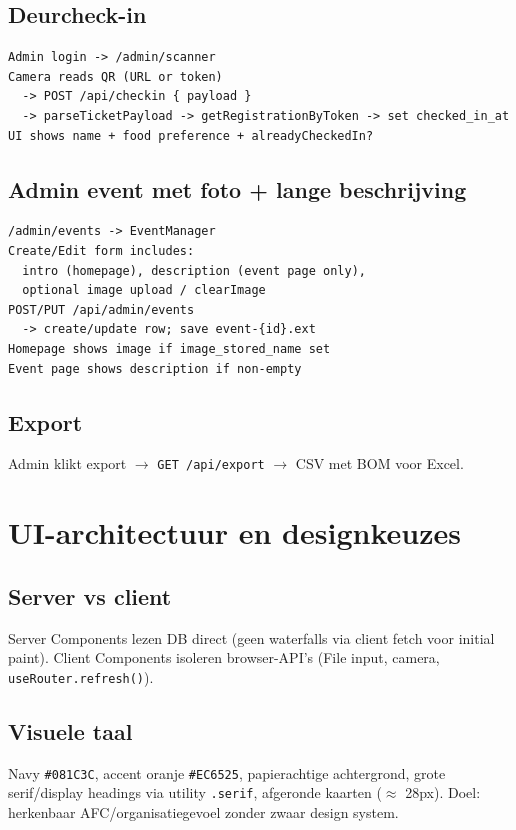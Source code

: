 \documentclass[11pt,a4paper]{report}
\begin{document}
\section{Deurcheck-in}
\begin{lstlisting}
Admin login -> /admin/scanner
Camera reads QR (URL or token)
  -> POST /api/checkin { payload }
  -> parseTicketPayload -> getRegistrationByToken -> set checked_in_at
UI shows name + food preference + alreadyCheckedIn?
\end{lstlisting}

\section{Admin event met foto + lange beschrijving}
\begin{lstlisting}
/admin/events -> EventManager
Create/Edit form includes:
  intro (homepage), description (event page only),
  optional image upload / clearImage
POST/PUT /api/admin/events
  -> create/update row; save event-{id}.ext
Homepage shows image if image_stored_name set
Event page shows description if non-empty
\end{lstlisting}

\section{Export}
Admin klikt export $\to$ \texttt{GET /api/export} $\to$ CSV met BOM voor Excel.

\chapter{UI-architectuur en designkeuzes}

\section{Server vs client}
Server Components lezen DB direct (geen waterfalls via client fetch voor initial paint).
Client Components isoleren browser-API's (File input, camera, \texttt{useRouter.refresh()}).

\section{Visuele taal}
Navy \texttt{\#081C3C}, accent oranje \texttt{\#EC6525}, papierachtige achtergrond,
grote serif/display headings via utility \texttt{.serif}, afgeronde kaarten ($\approx$ 28px).
Doel: herkenbaar AFC/organisatiegevoel zonder zwaar design system.
\end{document}
